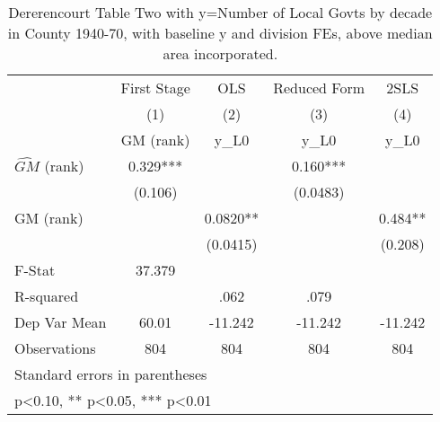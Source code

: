 \begin{table}[htbp]\centering
\def\sym#1{\ifmmode^{#1}\else\(^{#1}\)\fi}
\caption{Dererencourt Table Two with y=Number of Local Govts by decade in County 1940-70, with baseline y and division FEs, above median area incorporated.}
\begin{tabular}{l*{4}{c}}
\toprule
                    & First Stage   &         OLS   &Reduced Form   &        2SLS   \\
                    &\multicolumn{1}{c}{(1)}&\multicolumn{1}{c}{(2)}&\multicolumn{1}{c}{(3)}&\multicolumn{1}{c}{(4)}\\
                    &\multicolumn{1}{c}{GM  (rank)}&\multicolumn{1}{c}{y\_L0}&\multicolumn{1}{c}{y\_L0}&\multicolumn{1}{c}{y\_L0}\\
\midrule
$\hat{GM}$ (rank)   &       0.329***&               &       0.160***&               \\
                    &     (0.106)   &               &    (0.0483)   &               \\
\addlinespace
GM  (rank)          &               &      0.0820** &               &       0.484** \\
                    &               &    (0.0415)   &               &     (0.208)   \\
\midrule
F-Stat              &      37.379   &               &               &               \\
R-squared           &               &        .062   &        .079   &               \\
Dep Var Mean        &       60.01   &     -11.242   &     -11.242   &     -11.242   \\
Observations        &         804   &         804   &         804   &         804   \\
\bottomrule
\multicolumn{5}{l}{\footnotesize Standard errors in parentheses}\\
\multicolumn{5}{l}{\footnotesize * p<0.10, ** p<0.05, *** p<0.01}\\
\end{tabular}
\end{table}
